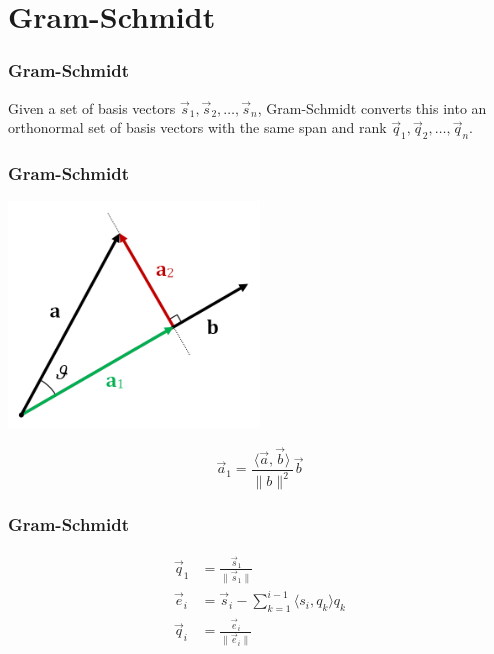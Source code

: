 \section{Gram-Schmidt}

\begin{frame}
    \frametitle{Gram-Schmidt}

    Given a set of basis vectors \(\vec{s}_1, \vec{s}_2, \ldots, \vec{s}_n\), Gram-Schmidt converts this into an orthonormal set of basis vectors with the same span and rank \(\vec{q}_1, \vec{q}_2, \ldots, \vec{q}_n\).
\end{frame}

\begin{frame}
    \frametitle{Gram-Schmidt}

    \begin{center}
        \includegraphics[width=0.5\textwidth]{images/projection.png}
    \end{center}

    \begin{equation}
        \vec{a}_1 = \frac{\langle \vec{a}, \vec{b} \rangle}{\|b\|^2} \vec{b}
    \end{equation}
\end{frame}

\begin{frame}
    \frametitle{Gram-Schmidt}

    \begin{align}
        \vec{q}_1 &= \frac{\vec{s}_1}{\|\vec{s}_1\|} \\
        \vec{e}_i &= \vec{s}_i - \sum_{k = 1}^{i - 1} \langle s_i, q_k \rangle q_k \\
        \vec{q}_i &= \frac{\vec{e}_i}{\|\vec{e}_i\|}
    \end{align}
\end{frame}
